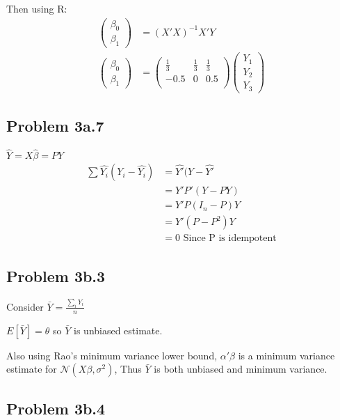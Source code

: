 \documentclass[a4paper]{article}
\begin{document}
Then using R:
\begin{align*}
\begin{pmatrix}\beta_0\\ \beta_1\end{pmatrix}&= (X'X)^{-1}X'Y\\
\begin{pmatrix}\beta_0\\ \beta_1\end{pmatrix}&= \begin{pmatrix}\frac{1}{3} & \frac{1}{3} & \frac{1}{3}\\ -0.5 & 0 & 0.5\\ \end{pmatrix}\begin{pmatrix}Y_1\\Y_2\\Y_3
\end{pmatrix}
\end{align*}

\subsection*{Problem 3a.7}
$\hat{Y} = X\hat{\beta} = PY$
\begin{align*}
\sum \hat{Y_i}(Y_i-\hat{Y_i}) &= \hat{Y'}(Y-\hat{Y'}\\
&= Y'P'(Y-PY)\\
&= Y'P(I_n-P)Y\\
&= Y'(P-P^2)Y\\
&=0\text{ Since P is idempotent}
\end{align*}
\subsection*{Problem 3b.3}
Consider $\bar{Y} = \frac{\sum_i Y_i}{n}$

$E[\bar{Y}] = \theta$ so $\bar{Y}$ is unbiased estimate.

Also using Rao's minimum variance lower bound, $\alpha'\beta$ is a minimum variance estimate for $\mathcal{N}(X\beta, \sigma^2)$, Thus $\bar{Y}$ is both unbiased and minimum variance.

\subsection*{Problem 3b.4}
\end{document}
